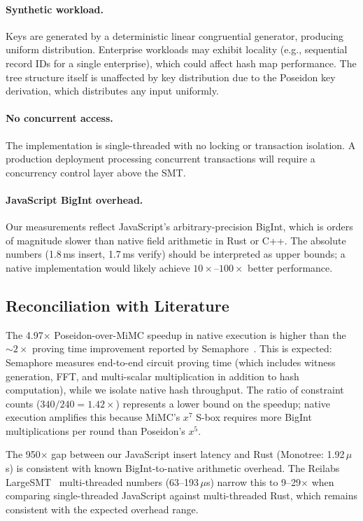 \paragraph{Synthetic workload.} Keys are generated by a deterministic linear congruential generator, producing uniform distribution. Enterprise workloads may exhibit locality (e.g., sequential record IDs for a single enterprise), which could affect hash map performance. The tree structure itself is unaffected by key distribution due to the Poseidon key derivation, which distributes any input uniformly.

\paragraph{No concurrent access.} The implementation is single-threaded with no locking or transaction isolation. A production deployment processing concurrent transactions will require a concurrency control layer above the SMT.

\paragraph{JavaScript BigInt overhead.} Our measurements reflect JavaScript's arbitrary-precision BigInt, which is orders of magnitude slower than native field arithmetic in Rust or C++. The absolute numbers (1.8\,ms insert, 1.7\,ms verify) should be interpreted as upper bounds; a native implementation would likely achieve $10\times$--$100\times$ better performance.

\subsection{Reconciliation with Literature}

The 4.97$\times$ Poseidon-over-MiMC speedup in native execution is higher than the ${\sim}2\times$ proving time improvement reported by Semaphore~\cite{semaphore2024v4}. This is expected: Semaphore measures end-to-end circuit proving time (which includes witness generation, FFT, and multi-scalar multiplication in addition to hash computation), while we isolate native hash throughput. The ratio of constraint counts ($340/240 = 1.42\times$) represents a lower bound on the speedup; native execution amplifies this because MiMC's $x^7$ S-box requires more BigInt multiplications per round than Poseidon's $x^5$.

The 950$\times$ gap between our JavaScript insert latency and Rust (Monotree: 1.92\,$\mu$s) is consistent with known BigInt-to-native arithmetic overhead. The Reilabs LargeSMT~\cite{reilabs2024largesmt} multi-threaded numbers (63--193\,$\mu$s) narrow this to 9--29$\times$ when comparing single-threaded JavaScript against multi-threaded Rust, which remains consistent with the expected overhead range.

